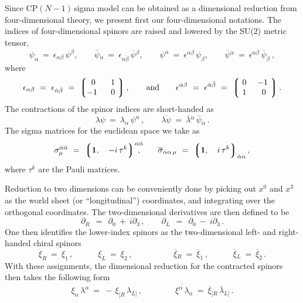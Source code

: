 \documentclass[epsfig,12pt]{article}
\def\beq{\begin{equation}}
\def\eeq{\end{equation}}
\newcommand{\cpn}{CP$(N-1)\,$}
\def\beq{\begin{equation}}
\def\eeq{\end{equation}}
\newcommand{\p}{\partial}
\newcommand{\ov}{\overline}
\newcommand{\lgr}{\left\lgroup}
\newcommand{\rgr}{\right\rgroup}
\begin{document}
{Since \cpn sigma model can be obtained as a dimensional reduction from four-dimensional theory,
we present first our four-dimensional notations.
The indices of four-dimensional spinors are raised and lowered by the SU(2) metric tensor,
\beq
	\psi_\alpha ~=~ \epsilon_{\alpha\beta}\, \psi^\beta, \qquad
	\ov{\psi}{}_{\dot{\alpha}} ~=~ \epsilon_{\dot{\alpha}\dot{\beta}}\, \ov{\psi}{}^{\dot\beta}, \qquad 
	\psi^\alpha ~=~ \epsilon^{\alpha\beta}\, \psi_\beta, \qquad
	\ov{\psi}{}^{\dot{\alpha}} ~=~ \epsilon^{\dot\alpha\dot\beta}\, \ov{\psi}{}_{\dot\beta}~,
\eeq
	where
\beq
	\epsilon_{\alpha\beta} ~=~ \epsilon_{\dot\alpha\dot\beta} ~=~
			\lgr \begin{matrix}
			     	\ 0\  &  \ 1\   \\
				 -1\  &  \ 0\  
			     \end{matrix} \rgr,
	\qquad \text{and} \qquad
	\epsilon^{\alpha\beta} ~=~ \epsilon^{\dot\alpha\dot\beta} ~=~
			\lgr \begin{matrix}
				\ 0\ &   -1\   \\
				\ 1\ &  \ 0\ 
			     \end{matrix} \rgr.
\eeq
The contractions of the spinor indices are short-handed as
\beq
	\lambda\psi ~=~ \lambda_\alpha\, \psi^\alpha\,, \qquad
	\ov{\lambda\psi} ~=~  \ov{\lambda}{}^{\dot\alpha}\, \ov{\psi}{}_{\dot\alpha}\,.
\eeq
The sigma matrices for the euclidean space we take as
\beq
	\sigma^{\alpha\dot\alpha}_\mu ~=~  \lgr {\bf 1},\quad -i\,\tau^k \rgr^{\alpha\dot{\alpha}}
	\hspace{-2.0ex},
	\qquad
	\ov{\sigma}{}_{\dot\alpha\alpha\, \mu} ~=~ 
			\lgr {\bf 1},\quad i\, \tau^k \rgr_{\dot\alpha\alpha},
\eeq
where $ \tau^k $ are the Pauli matrices.

Reduction to two dimensions can be conveniently done by picking out $ x^0 $ and $ x^3 $ 
as the world sheet (or ``longitudinal'') coordinates, and integrating over the orthogonal coordinates. 
The two-dimensional derivatives are then defined to be
\beq
	\p_R  ~~=~~ \p_0 ~+~ i\p_3\,, \qquad   \p_L ~~=~~ \p_0 ~-~ i\p_3\,.
\eeq
One then identifies the lower-index spinors as the two-dimensional left- and right-handed chiral spinors
\beq
	\xi_{R} ~=~ \xi_{1}\,, \quad\qquad
	\xi_{L} ~=~ \xi_{2}\,, \quad\qquad\qquad
	\ov{\xi}{}_{R} ~=~ \ov{\xi}{}_{\dot{1}}\,, \quad\qquad
	\ov{\xi}{}_{L} ~=~ \ov{\xi}{}_{\dot{2}}\,.
\eeq
With these assignments, the dimensional reduction for the contracted spinors then takes the following form
\beq
	\xi_\alpha\, \lambda^\alpha   ~=~   -\, \xi_{[R}\, \lambda_{L]}\,,
	\qquad\qquad
	\ov{\xi^{\dot\alpha}\, \lambda}{}_{\dot\alpha}   ~=~  \ov{\xi}{}_{[R}\, \ov{\lambda}{}_{L]}\,.
\eeq

}
\end{document}
